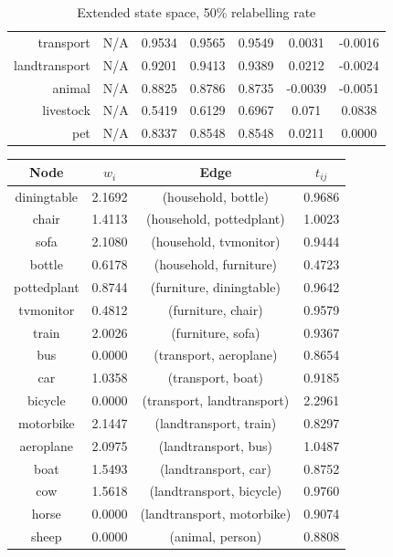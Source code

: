 \documentclass[11pt,a4paper]{article}
\begin{document}
\begin{table}[htbp]
\begin{tabular}{r|c|c|c|c|c|c}
transport     & N/A    & 0.9534 & 0.9565 & 0.9549 & 0.0031 & -0.0016\\
landtransport & N/A    & 0.9201 & 0.9413 & 0.9389 & 0.0212 & -0.0024\\
animal        & N/A    & 0.8825 & 0.8786 & 0.8735 & -0.0039 & -0.0051\\
livestock     & N/A    & 0.5419 & 0.6129 & 0.6967 & 0.071 & 0.0838\\
pet           & N/A    & 0.8337 & 0.8548 & 0.8548 & 0.0211 & 0.0000\\
\end{tabular}
\caption{Extended state space, 50\% relabelling rate}
\label{tab:50accuracy}
\end{table}

\begin{table}[htbp]
\centering
\begin{tabular}{c|c|c|c}
Node & $w_i$ & Edge & $t_{ij}$\\\hline
diningtable   & 2.1692 & (household, bottle)        & 0.9686\\
chair         & 1.4113 & (household, pottedplant)   & 1.0023\\
sofa          & 2.1080 & (household, tvmonitor)     & 0.9444\\
bottle        & 0.6178 & (household, furniture)     & 0.4723\\
pottedplant   & 0.8744 & (furniture, diningtable)   & 0.9642\\
tvmonitor     & 0.4812 & (furniture, chair)         & 0.9579\\
train         & 2.0026 & (furniture, sofa)          & 0.9367\\
bus           & 0.0000 & (transport, aeroplane)     & 0.8654\\
car           & 1.0358 & (transport, boat)          & 0.9185\\
bicycle       & 0.0000 & (transport, landtransport) & 2.2961\\
motorbike     & 2.1447 & (landtransport, train)     & 0.8297\\
aeroplane     & 2.0975 & (landtransport, bus)       & 1.0487\\
boat          & 1.5493 & (landtransport, car)       & 0.8752\\
cow           & 1.5618 & (landtransport, bicycle)   & 0.9760\\
horse         & 0.0000 & (landtransport, motorbike) & 0.9074\\
sheep         & 0.0000 & (animal, person)           & 0.8808\\

\end{tabular}
\end{table}
\end{document}
